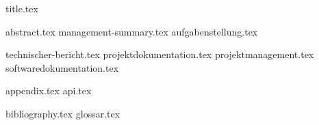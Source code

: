\documentclass{scrbook}
\begin{document}
	\frontmatter
		{title.tex} 
		\clearpage


		{abstract.tex}
		{management-summary.tex}
		{aufgabenstellung.tex}

		\clearpage
		\tableofcontents

		\clearpage
		\listoffigures
		

		\listoftables
		

		



	\mainmatter
		{technischer-bericht.tex}
		{projektdokumentation.tex}
		{projektmanagement.tex}
		{softwaredokumentation.tex}
	
		\cleardoublepage
		\appendix
		{appendix.tex}
		{api.tex}

		
	\backmatter
		{bibliography.tex}
		{glossar.tex}
	
\end{document}

